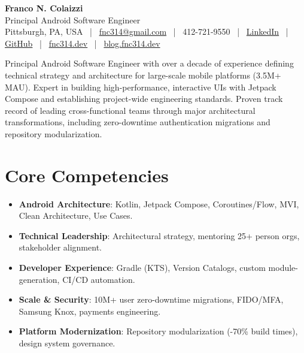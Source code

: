 \documentclass[11pt,a4paper,sans]{moderncv}
\makeatletter
\newcommand{\customcvtitle}{
    \begin{center}
        {\rmfamily\Huge\bfseries\color{color1} Franco N. Colaizzi}\\[0.2em]
        {\rmfamily\Large\color{color1} Principal Android Software Engineer}\\[0.6em]
        {\sffamily
            Pittsburgh, PA, USA
            ~|~ \href{mailto:fnc314@gmail.com}{fnc314@gmail.com} 
            ~|~ 412-721-9550 
            ~|~ \href{https://linkedin.com/in/fnc314}{LinkedIn} 
            ~|~ \href{https://github.com/fnc314}{GitHub} 
            ~|~ \href{https://www.fnc314.dev}{fnc314.dev} 
            ~|~ \href{https://blog.fnc314.dev}{blog.fnc314.dev}
        }
    \end{center}
    \vspace{1em}
}
\makeatother
\begin{document}
\customcvtitle


\vspace{6pt}
\small{Principal Android Software Engineer with over a decade of experience defining technical strategy and architecture for large-scale mobile platforms (3.5M+ MAU). Expert in building high-performance, interactive UIs with Jetpack Compose and establishing project-wide engineering standards. Proven track record of leading cross-functional teams through major architectural transformations, including zero-downtime authentication migrations and repository modularization.}

\section{Core Competencies}
\vspace{1pt}
\begin{itemize}
\item \textbf{\rmfamily Android Architecture}: Kotlin, Jetpack Compose, Coroutines/Flow, MVI, Clean Architecture, Use Cases.
\item \textbf{\rmfamily Technical Leadership}: Architectural strategy, mentoring 25+ person orgs, stakeholder alignment.
\item \textbf{\rmfamily Developer Experience}: Gradle (KTS), Version Catalogs, custom module-generation, CI/CD automation.
\item \textbf{\rmfamily Scale \& Security}: 10M+ user zero-downtime migrations, FIDO/MFA, Samsung Knox, payments engineering.
\item \textbf{\rmfamily Platform Modernization}: Repository modularization (-70\% build times), design system governance.
\end{itemize}

\end{document}
